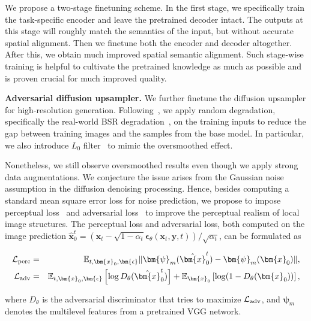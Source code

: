 We propose a two-stage finetuning scheme. In the first stage, we specifically train the task-specific encoder and leave the pretrained decoder intact. The outputs at this stage will roughly match the semantics of the input, but without accurate spatial alignment. Then we finetune both the encoder and decoder altogether. After this, we obtain much improved spatial semantic alignment. Such stage-wise training is helpful to cultivate the pretrained knowledge as much as possible and is proven crucial for much improved quality.

\textbf{Adversarial diffusion upsampler.} We further finetune the diffusion upsampler for high-resolution generation. Following~\cite{ho2022cascaded,ramesh2022hierarchical}, we apply random degradation, specifically the real-world BSR degradation~\cite{zhang2021designing}, on the training inputs to reduce the gap between training images and the samples from the base model. In particular, we also introduce $L_0$ filter~\cite{xu2011image} to mimic the oversmoothed effect.

Nonetheless, we still observe oversmoothed results even though we apply strong data augmentations. We conjecture the issue arises from the Gaussian noise assumption in the diffusion denoising processing. Hence, besides computing a standard mean square error loss for noise prediction, we propose to impose perceptual loss~\cite{johnson2016perceptual} and adversarial loss~\cite{goodfellow2014generative} to improve the perceptual realism of local image structures. The perceptual loss and adversarial loss, both computed on the image prediction $\hat{\bm{x}}_0^t = (\bm{x}_t - \sqrt{1-\alpha_t}\bm{\epsilon}_\theta(\bm{x}_t,\bm{y}, t))/\sqrt{\alpha_t}$, can be formulated as

\begin{eqnarray}
    \mathcal{L}_\textnormal{perc}&=& \mathbb{E}_{t,\bm{x}_0,\bm{\epsilon}}  \|\bm{\psi}_m(\hat{\bm{x}}_0^t) - \bm{\psi}_m(\bm{x}_0) \|,\\
    \mathcal{L}_\textnormal{adv}&=&   

    \mathbb{E}_{t,\bm{x}_0,\bm{\epsilon}} \left[\log D_{\theta}(\hat{\bm{x}}_0^t)\right]   +    \mathbb{E}_{\bm{x}_0} \left[\log (1 - D_{\theta}(\bm{x}_0) )\right],
\end{eqnarray}

where $D_{\theta}$ is the adversarial discriminator that tries to maximize $\mathcal{L}_{\textnormal{adv}}$, and $\bm{\psi}_m$ denotes the multilevel features from a pretrained VGG network.

